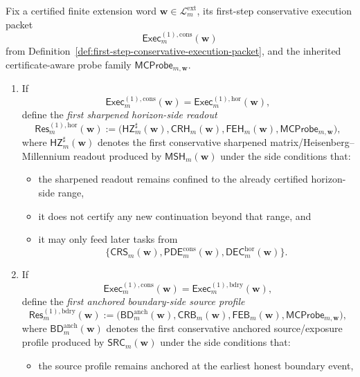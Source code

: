 \begin{definition}
\label{def:first-conservative-result-form}
Fix a certified finite extension word \(\mathbf w\in\mathcal L^{\mathrm{ext}}_{m}\), its first-step conservative execution packet
\[
  \mathsf{Exec}^{(1),\mathrm{cons}}_{m}(\mathbf w)
\]
from Definition~\ref{def:first-step-conservative-execution-packet}, and the inherited certificate-aware probe family \(\mathsf{MCProbe}_{m,\mathbf w}\).
\begin{enumerate}[label=(\roman*)]
  \item If
  \[
    \mathsf{Exec}^{(1),\mathrm{cons}}_{m}(\mathbf w)=\mathsf{Exec}^{(1),\mathrm{hor}}_{m}(\mathbf w),
  \]
  define the \emph{first sharpened horizon-side readout}
  \[
    \mathsf{Res}^{(1),\mathrm{hor}}_{m}(\mathbf w)
    :=
    \bigl(\mathsf{HZ}^{\sharp}_{m}(\mathbf w),\mathsf{CRH}_{m}(\mathbf w),\mathsf{FEH}_{m}(\mathbf w),\mathsf{MCProbe}_{m,\mathbf w}\bigr),
  \]
  where \(\mathsf{HZ}^{\sharp}_{m}(\mathbf w)\) denotes the first conservative sharpened matrix/Heisenberg--Millennium readout produced by \(\mathsf{MSH}_{m}(\mathbf w)\) under the side conditions that:
  \begin{itemize}[leftmargin=2em]
    \item the sharpened readout remains confined to the already certified horizon-side range,
    \item it does not certify any new continuation beyond that range, and
    \item it may only feed later tasks from
    \[
      \{\mathsf{CRS}_{m}(\mathbf w),\mathsf{PDE}^{\mathrm{cons}}_{m}(\mathbf w),\mathsf{DEC}^{\mathrm{hor}}_{m}(\mathbf w)\}.
    \]
  \end{itemize}
  \item If
  \[
    \mathsf{Exec}^{(1),\mathrm{cons}}_{m}(\mathbf w)=\mathsf{Exec}^{(1),\mathrm{bdry}}_{m}(\mathbf w),
  \]
  define the \emph{first anchored boundary-side source profile}
  \[
    \mathsf{Res}^{(1),\mathrm{bdry}}_{m}(\mathbf w)
    :=
    \bigl(\mathsf{BD}^{\mathrm{anch}}_{m}(\mathbf w),\mathsf{CRB}_{m}(\mathbf w),\mathsf{FEB}_{m}(\mathbf w),\mathsf{MCProbe}_{m,\mathbf w}\bigr),
  \]
  where \(\mathsf{BD}^{\mathrm{anch}}_{m}(\mathbf w)\) denotes the first conservative anchored source/exposure profile produced by \(\mathsf{SRC}_{m}(\mathbf w)\) under the side conditions that:
  \begin{itemize}[leftmargin=2em]
    \item the source profile remains anchored at the earliest honest boundary event,

\end{itemize}
\end{enumerate}
\end{definition}
